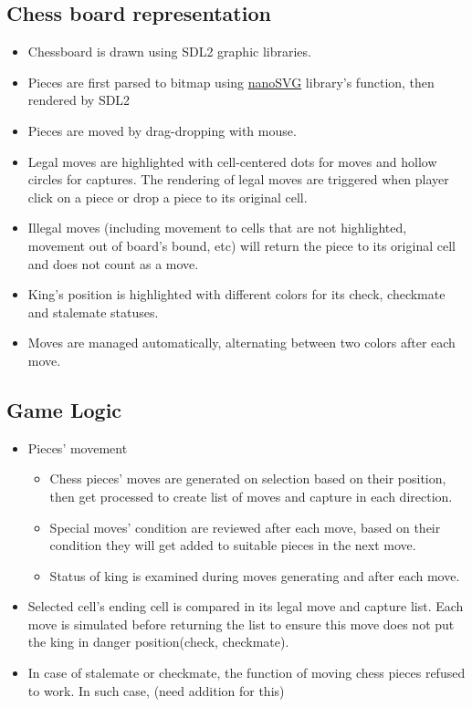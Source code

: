 \documentclass[a4paper, 10pt, titlepage]{article}
\begin{document}
\subsection{Chess board representation}
\begin{itemize}
    \item Chessboard is drawn using SDL2 graphic libraries.
    \item Pieces are first parsed to bitmap using \href{https://github.com/memononen/nanosvg}{nanoSVG} library's function, then rendered by SDL2
    \item Pieces are moved by drag-dropping with mouse.
    \item Legal moves are highlighted with cell-centered dots for moves and hollow circles for captures. The rendering of legal moves are triggered when player click on a piece or drop a piece to its original cell.
    \item Illegal moves (including movement to cells that are not highlighted, movement out of board's bound, etc) will return the piece to its original cell and does not count as a move.
    \item King's position is highlighted with different colors for its check, checkmate and stalemate statuses.
    \item Moves are managed automatically, alternating between two colors after each move.
\end{itemize}
\subsection{Game Logic}
\begin{itemize}
    \item Pieces' movement
          \begin{itemize}
              \item Chess pieces' moves are generated on selection based on their position, then get processed to create list of moves and capture in each direction.
              \item Special moves' condition are reviewed after each move, based on their condition they will get added to suitable pieces in the next move.
              \item Status of king is examined during moves generating and after each move.
          \end{itemize}
    \item Selected cell's ending cell is compared in its legal move and capture list. Each move is simulated before returning the list to ensure this move does not put the king in danger position(check, checkmate).
    \item In case of stalemate or checkmate, the function of moving chess pieces refused to work. In such case, (need addition for this)
\end{itemize}
\end{document}
